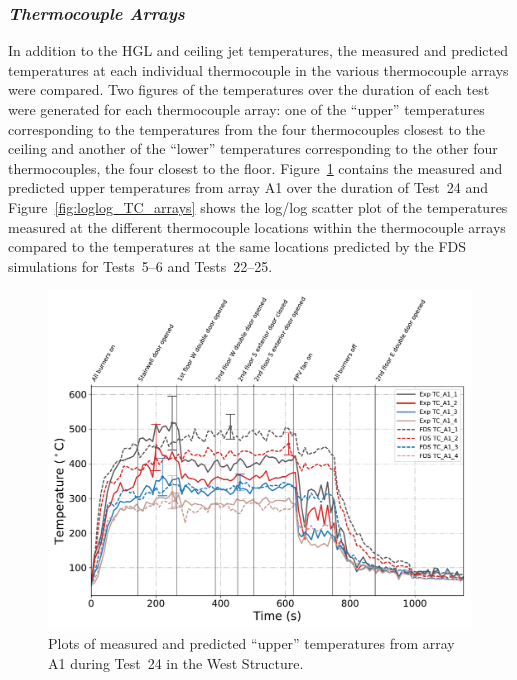 \subsubsection*{\textit{Thermocouple Arrays}}
In addition to the HGL and ceiling jet temperatures, the measured and predicted temperatures at each individual thermocouple in the various thermocouple arrays were compared. Two figures of the temperatures over the duration of each test were generated for each thermocouple array: one of the ``upper'' temperatures corresponding to the temperatures from the four thermocouples closest to the ceiling and another of the ``lower'' temperatures corresponding to the other four thermocouples, the four closest to the floor. Figure~\ref{fig:TCarray_data} contains the measured and predicted upper temperatures from array A1 over the duration of Test~24 and Figure~\ref{fig:loglog_TC_arrays} shows the log/log scatter plot of the temperatures measured at the different thermocouple locations within the thermocouple arrays compared to the temperatures at the same locations predicted by the FDS simulations for Tests~5--6 and Tests~22--25.
\begin{figure}[!h]
	\centering
	\includegraphics[width=\columnwidth]{Figures/Plots/Validation/Temperature/Test_24_TC_A1_upper}
	\caption[Plot of the measured and predicted upper temperatures from array A1 during Test~24.]{Plots of measured and predicted ``upper'' temperatures from array A1 during Test~24 in the West Structure.}
	\label{fig:TCarray_data}
\end{figure}

